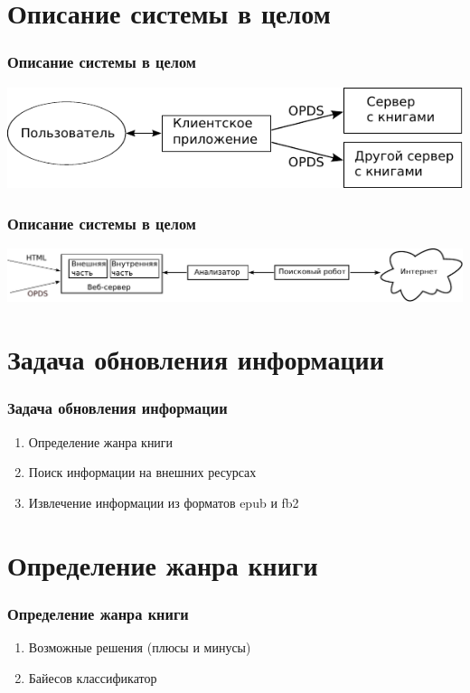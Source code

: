 \documentclass[handout]{beamer}
\begin{document}
\section{Описание системы в целом}
  \begin{frame}
    \frametitle{Описание системы в целом}

    \includegraphics{./head/scheme}
  \end{frame}

  \begin{frame}
    \frametitle{Описание системы в целом}

    \includegraphics[width=1.05\textwidth]{./head/innerstructure}
  \end{frame}  

\section{Задача обновления информации}
  \begin{frame}
    \frametitle{Задача обновления информации}
  
    \begin{enumerate}
      \item Определение жанра книги
      \item Поиск информации на внешних ресурсах
      \item Извлечение информации из форматов epub и fb2 
    \end{enumerate}
  \end{frame}

\section{Определение жанра книги}
  \begin{frame}
    \frametitle{Определение жанра книги}  
    
    \begin{enumerate}
      \item Возможные решения (плюсы и минусы)
      \item Байесов классификатор
    \end{enumerate}        
  \end{frame}
\end{document}
